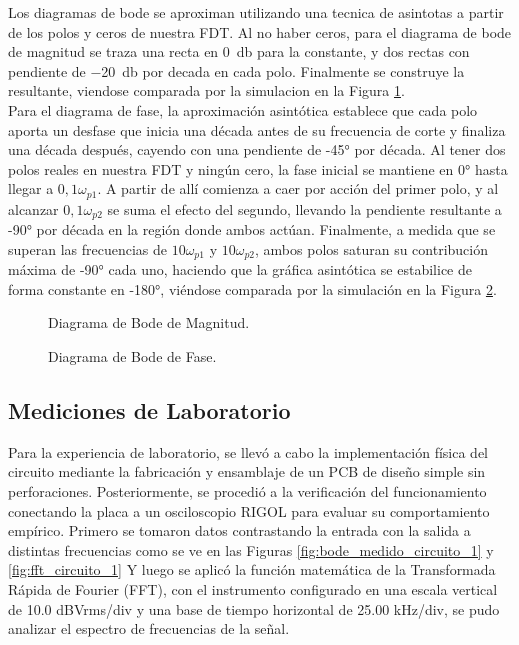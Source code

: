 Los diagramas de bode se aproximan utilizando una tecnica de asintotas a partir de los polos y ceros de nuestra FDT.
Al no haber ceros, para el diagrama de bode de magnitud se traza una recta en \SI{0}{\decibel} para la constante, y dos
rectas con pendiente de \SI{-20}{\decibel} por decada en cada polo. Finalmente se construye la resultante, viendose
comparada por la simulacion en la Figura \ref{fig:bode_mag_circuito_1}.\\
Para el diagrama de fase, la aproximación asintótica establece que cada polo aporta un desfase que inicia una década
antes de su frecuencia de corte y finaliza una década después, cayendo con una pendiente de -45° por década. Al tener
dos polos reales en nuestra FDT y ningún cero, la fase inicial se mantiene en 0° hasta llegar a $0,1\omega_{p1}$. A partir
de allí comienza a caer por acción del primer polo, y al alcanzar $0,1\omega_{p2}$ se suma el efecto del segundo, llevando
la pendiente resultante a -90° por década en la región donde ambos actúan. Finalmente, a medida que se superan las frecuencias
de $10\omega_{p1}$ y $10\omega_{p2}$, ambos polos saturan su contribución máxima de -90° cada uno, haciendo que la gráfica
asintótica se estabilice de forma constante en -180°, viéndose comparada por la simulación en la Figura \ref{fig:bode_phase_circuito_1}.


\begin{figure}[H]
  \centering
  
  \caption{Diagrama de Bode de Magnitud.}
  \label{fig:bode_mag_circuito_1}
\end{figure}

\begin{figure}[H]
  \centering
  
  \caption{Diagrama de Bode de Fase.}
  \label{fig:bode_phase_circuito_1}
\end{figure}

\subsection{Mediciones de Laboratorio}
Para la experiencia de laboratorio, se llevó a cabo la implementación física del circuito mediante la fabricación y
ensamblaje de un PCB de diseño simple sin perforaciones. Posteriormente, se procedió a la verificación del funcionamiento conectando la
placa a un osciloscopio RIGOL para evaluar su comportamiento empírico. 
Primero se tomaron datos contrastando la entrada con la salida a distintas frecuencias como se ve en las Figuras \ref{fig:bode_medido_circuito_1} y \ref{fig:fft_circuito_1}
Y luego se aplicó la función matemática de la Transformada Rápida de Fourier (FFT), con el instrumento configurado en una escala vertical de 10.0 dBVrms/div y una
base de tiempo horizontal de 25.00 kHz/div, se pudo analizar el espectro de frecuencias de la señal.



